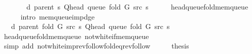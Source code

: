 \begin{isabellebody}
\ \ \isamarkupfalse%
\ \isamarkupfalse%
\ {\isachardoublequoteopen}{\isachardot}{\kern0pt}{\isachardot}{\kern0pt}{\isachardot}{\kern0pt}\ {\isasymle}\ d\ {\isacharparenleft}{\kern0pt}parent\ s{\isacharparenright}{\kern0pt}\ {\isacharparenleft}{\kern0pt}Q{\isacharunderscore}{\kern0pt}head\ {\isacharparenleft}{\kern0pt}queue\ {\isacharparenleft}{\kern0pt}fold\ G\ src\ s{\isacharparenright}{\kern0pt}{\isacharparenright}{\kern0pt}{\isacharparenright}{\kern0pt}{\isachardoublequoteclose}\isanewline
\ \ \ \ \isamarkupfalse%
\ head{\isacharunderscore}{\kern0pt}queue{\isacharunderscore}{\kern0pt}fold{\isacharunderscore}{\kern0pt}mem{\isacharunderscore}{\kern0pt}queue\isanewline
\ \ \ \ \isamarkupfalse%
\ {\isacharparenleft}{\kern0pt}intro\ mem{\isacharunderscore}{\kern0pt}queue{\isacharunderscore}{\kern0pt}imp{\isacharunderscore}{\kern0pt}d{\isacharunderscore}{\kern0pt}ge{\isacharparenright}{\kern0pt}\isanewline
\ \ \isamarkupfalse%
\ \isamarkupfalse%
\ {\isachardoublequoteopen}{\isachardot}{\kern0pt}{\isachardot}{\kern0pt}{\isachardot}{\kern0pt}\ {\isacharequal}{\kern0pt}\ d\ {\isacharparenleft}{\kern0pt}parent\ {\isacharparenleft}{\kern0pt}fold\ G\ src\ s{\isacharparenright}{\kern0pt}{\isacharparenright}{\kern0pt}\ {\isacharparenleft}{\kern0pt}Q{\isacharunderscore}{\kern0pt}head\ {\isacharparenleft}{\kern0pt}queue\ {\isacharparenleft}{\kern0pt}fold\ G\ src\ s{\isacharparenright}{\kern0pt}{\isacharparenright}{\kern0pt}{\isacharparenright}{\kern0pt}{\isachardoublequoteclose}\isanewline
\ \ \ \ \isamarkupfalse%
\ head{\isacharunderscore}{\kern0pt}queue{\isacharunderscore}{\kern0pt}fold{\isacharunderscore}{\kern0pt}mem{\isacharunderscore}{\kern0pt}queue\ not{\isacharunderscore}{\kern0pt}white{\isacharunderscore}{\kern0pt}if{\isacharunderscore}{\kern0pt}mem{\isacharunderscore}{\kern0pt}queue\isanewline
\ \ \ \ \isamarkupfalse%
\ {\isacharparenleft}{\kern0pt}simp\ add{\isacharcolon}{\kern0pt}\ not{\isacharunderscore}{\kern0pt}white{\isacharunderscore}{\kern0pt}imp{\isacharunderscore}{\kern0pt}rev{\isacharunderscore}{\kern0pt}follow{\isacharunderscore}{\kern0pt}fold{\isacharunderscore}{\kern0pt}eq{\isacharunderscore}{\kern0pt}rev{\isacharunderscore}{\kern0pt}follow{\isacharparenright}{\kern0pt}\isanewline
\ \ \isamarkupfalse%
\ \isamarkupfalse%
\ {\isacharquery}{\kern0pt}thesis\isanewline
\ \ \ \ \isacommand{{\isachardot}{\kern0pt}}\isamarkupfalse%
\isanewline
{}\isamarkupfalse%
%
\endisatagproof

\end{isabellebody}
